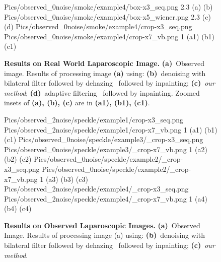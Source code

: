 \begin{figure}[!t]
     {Pics/observed_0noise/smoke/example4/box-x3_seq.png} {2.3} {(a)} {(b)}
     {Pics/observed_0noise/smoke/example4/box-x5_wiener.png} {2.3} {(c)} {(d)}
     {Pics/observed_0noise/smoke/example4/crop-x3_seq.png} {Pics/observed_0noise/smoke/example4/crop-x7_vb.png} {1} {(a1)} {(b1)} {(c1)}
    \caption
    {
        {\bf Results on Real World Laparoscopic Image.}
        {\bf (a)}~Observed image.
        Results of processing image {\bf (a)} using:
        {\bf (b)}~denoising with bilateral filter followed by dehazing~\cite{he2011dark} followed by inpainting;
        {\bf (c)}~{\em our method};
        {\bf (d)}~adaptive filtering~\cite{gibson2013wiener} followed by inpainting.
        Zoomed insets of {\bf (a), (b), (c)} are in {\bf (a1), (b1), (c1)}.
    }
    \label{fig:resultsObs3}
\end{figure}

\begin{figure}[!t]
     {Pics/observed_2noise/speckle/example1/crop-x3_seq.png} {Pics/observed_2noise/speckle/example1/crop-x7_vb.png} {1} {(a1)} {(b1)} {(c1)}
     {Pics/observed_0noise/speckle/example3/_crop-x3_seq.png} {Pics/observed_0noise/speckle/example3/_crop-x7_vb.png} {1} {(a2)} {(b2)} {(c2)}
     {Pics/observed_0noise/speckle/example2/_crop-x3_seq.png} {Pics/observed_0noise/speckle/example2/_crop-x7_vb.png} {1} {(a3)} {(b3)} {(c3)}
     {Pics/observed_2noise/speckle/example4/_crop-x3_seq.png} {Pics/observed_2noise/speckle/example4/_crop-x7_vb.png} {1} {(a4)} {(b4)} {(c4)}
    \caption
    {
        {\bf Results on Observed Laparoscopic Images.}
        {\bf (a)}~Observed Image.
        Results of processing image (a) using:
        {\bf (b)}~denoising with bilateral filter followed by dehazing~\cite{he2011dark} followed by inpainting;
        {\bf (c)}~{\em our method}.
    }
    \label{fig:resultsObs4}
\end{figure}
